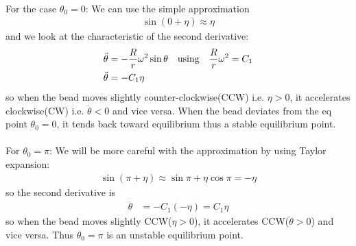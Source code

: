 \documentclass[../hw.tex]{subfiles}
\begin{document}
\paragraph*{}For the case $\theta_0 = 0$: We can use the simple approximation
\begin{align*}
    \sin(0 + \eta) \approx \eta
\end{align*}
and we look at the characteristic of the second derivative:
\begin{align*}
    \ddot \theta &= - \frac{R}{r} \omega^2 \sin\theta \qusing \frac{R}{r} \omega^2 = C_1 \\
    \ddot \theta &= -C_1 \eta
\end{align*}
so when the bead moves slightly counter-clockwise(CCW) i.e. $\eta > 0$, it accelerates clockwise(CW) 
i.e. $\ddot \theta < 0$ and vice versa. When the bead deviates from the eq point $\theta_0 = 0$, it
tends back toward equilibrium thus a stable equilibrium point.
\paragraph*{} For $\theta_0 = \pi$: We will be more careful with the approximation by using Taylor
expansion:
\begin{align*}
    \sin(\pi + \eta) \approx \sin\pi + \eta \cos\pi = -\eta
\end{align*}
so the second derivative is
\begin{align*}
    \ddot \theta &= -C_1 (-\eta) = C_1 \eta
\end{align*}
so when the bead moves slightly CCW($\eta > 0$), it accelerates CCW($\ddot \theta > 0$) and vice
versa. Thus $\theta_0 = \pi$ is an unstable equilibrium point.

\newpage 
\end{document}

